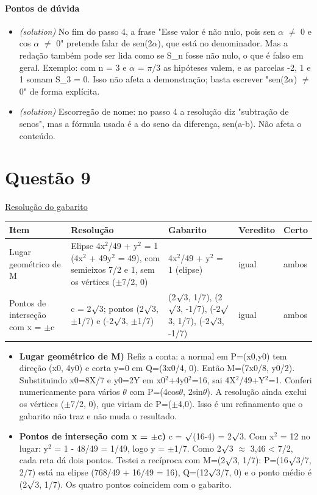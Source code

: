 \documentclass{article}%
\begin{document}
\paragraph{Pontos de dúvida}%
\begin{itemize}%
\item%
\textit{(solution)} No fim do passo 4, a frase "Esse valor é não nulo, pois sen $\alpha$ $\neq$ 0 e cos $\alpha$ $\neq$ 0" pretende falar de sen(2$\alpha$), que está no denominador. Mas a redação também pode ser lida como se S\_n fosse não nulo, o que é falso em geral. Exemplo: com n = 3 e $\alpha$ = $\pi$/3 as hipóteses valem, e as parcelas -2, 1 e 1 somam S\_3 = 0. Isso não afeta a demonstração; basta escrever "sen(2$\alpha$) $\neq$ 0" de forma explícita.%
\item%
\textit{(solution)} Escorregão de nome: no passo 4 a resolução diz "subtração de senos", mas a fórmula usada é a do seno da diferença, sen(a-b). Não afeta o conteúdo.%
\end{itemize}%
\section*{Questão 9}%
\href{https://poliedroresolve.sistemapoliedro.com.br/vestibulares/ime/2027/ime-2-fase-dia-1-26-10-2026-2-fase-dia-1/dissertativa-9-matematica-2-fase-dia-1-ime-2027}{Resolução do gabarito}\par\smallskip%
\begin{longtable}{@{}p{} p{} p{} p{} p{}@{}}\toprule Item & Resolução & Gabarito & Veredito & Certo \\ \midrule
Lugar geométrico de M & Elipse 4x$^2$/49 + y$^2$ = 1 (4x$^2$ + 49y$^2$ = 49), com semieixos 7/2 e 1, sem os vértices ($\pm$7/2, 0) & 4x$^2$/49 + y$^2$ = 1 (elipse) & igual & ambos \\
Pontos de interseção com x = $\pm$c & c = 2$\surd$3; pontos (2$\surd$3, $\pm$1/7) e (-2$\surd$3, $\pm$1/7) & (2$\surd$3, 1/7), (2$\surd$3, -1/7), (-2$\surd$3, 1/7), (-2$\surd$3, -1/7) & igual & ambos \\
\bottomrule\end{longtable}%
\begin{itemize}%
\item%
\textbf{Lugar geométrico de M)} Refiz a conta: a normal em P=(x0,y0) tem direção (x0, 4y0) e corta y=0 em Q=(3x0/4, 0). Então M=(7x0/8, y0/2). Substituindo x0=8X/7 e y0=2Y em x0$^2$+4y0$^2$=16, sai 4X$^2$/49+Y$^2$=1. Conferi numericamente para vários $\theta$ com P=(4cos$\theta$, 2sin$\theta$). A resolução ainda exclui os vértices ($\pm$7/2, 0), que viriam de P=($\pm$4,0). Isso é um refinamento que o gabarito não traz e não muda o resultado.%
\item%
\textbf{Pontos de interseção com x = $\pm$c)} c = $\surd$(16-4) = 2$\surd$3. Com x$^2$ = 12 no lugar: y$^2$ = 1 - 48/49 = 1/49, logo y = $\pm$1/7. Como 2$\surd$3 $\approx$ 3,46 < 7/2, cada reta dá dois pontos. Testei a recíproca com M=(2$\surd$3, 1/7): P=(16$\surd$3/7, 2/7) está na elipse (768/49 + 16/49 = 16), Q=(12$\surd$3/7, 0) e o ponto médio é (2$\surd$3, 1/7). Os quatro pontos coincidem com o gabarito.%
\end{itemize}%
\end{document}
